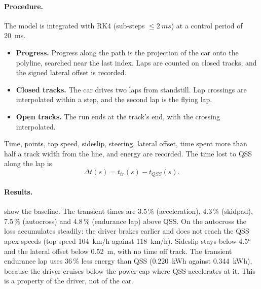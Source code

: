 \documentclass[11pt]{article}
\begin{document}
\paragraph{Procedure.} The model is integrated with RK4 (sub-steps $\le\SI{2}{ms}$) at a control period of
\SI{20}{ms}.
\begin{itemize}
  \item \textbf{Progress.} Progress along the path is the projection of the car onto the polyline, searched near
        the last index. Laps are counted on closed tracks, and the signed lateral offset is recorded.
  \item \textbf{Closed tracks.} The car drives two laps from standstill. Lap crossings are interpolated within a
        step, and the second lap is the flying lap.
  \item \textbf{Open tracks.} The run ends at the track's end, with the crossing interpolated.
\end{itemize}
Time, points, top speed, sideslip, steering, lateral offset, time spent more than half a track width from the line,
and energy are recorded. The time lost to QSS along the lap is
\begin{equation}
\Delta t(s) = t_{tr}(s) - t_{QSS}(s).
\end{equation}

\paragraph{Results.}  show the baseline. The transient times are 3.5\,\%
(acceleration), 4.3\,\% (skidpad), 7.5\,\% (autocross) and 4.8\,\% (endurance lap) above QSS. On the autocross the
loss accumulates steadily: the driver brakes earlier and does not reach the QSS apex speeds (top speed
\SI{104}{km/h} against \SI{118}{km/h}). Sideslip stays below \ang{4.5} and the lateral offset below \SI{0.52}{m},
with no time off track. The transient endurance lap uses 36\,\% less energy than QSS
(\SI{0.220}{kWh} against \SI{0.344}{kWh}), because the driver cruises below the power cap where QSS accelerates at
it. This is a property of the driver, not of the car.
\end{document}
